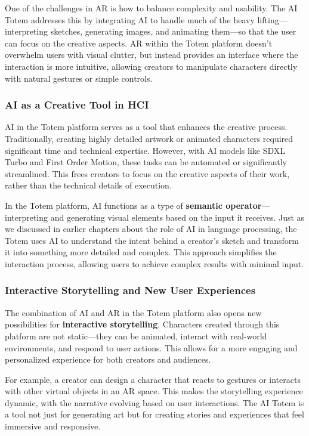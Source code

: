 One of the challenges in AR is how to balance complexity and usability.
The AI Totem addresses this by integrating AI to handle much of the heavy lifting—interpreting sketches, generating images, and animating them—so that the user can focus on the creative aspects.
AR within the Totem platform doesn't overwhelm users with visual clutter, but instead provides an interface where the interaction is more intuitive, allowing creators to manipulate characters directly with natural gestures or simple controls.

\subsubsection{ AI as a Creative Tool in HCI}

AI in the Totem platform serves as a tool that enhances the creative process.
Traditionally, creating highly detailed artwork or animated characters required significant time and technical expertise.
However, with AI models like SDXL Turbo and First Order Motion, these tasks can be automated or significantly streamlined.
This frees creators to focus on the creative aspects of their work, rather than the technical details of execution.

In the Totem platform, AI functions as a type of \textbf{semantic operator}—interpreting and generating visual elements based on the input it receives.
Just as we discussed in earlier chapters about the role of AI in language processing, the Totem uses AI to understand the intent behind a creator’s sketch and transform it into something more detailed and complex.
This approach simplifies the interaction process, allowing users to achieve complex results with minimal input.

\subsubsection{ Interactive Storytelling and New User Experiences}

The combination of AI and AR in the Totem platform also opens new possibilities for \textbf{interactive storytelling}.
Characters created through this platform are not static—they can be animated, interact with real-world environments, and respond to user actions.
This allows for a more engaging and personalized experience for both creators and audiences.

For example, a creator can design a character that reacts to gestures or interacts with other virtual objects in an AR space.
This makes the storytelling experience dynamic, with the narrative evolving based on user interactions.
The AI Totem is a tool not just for generating art but for creating stories and experiences that feel immersive and responsive.

